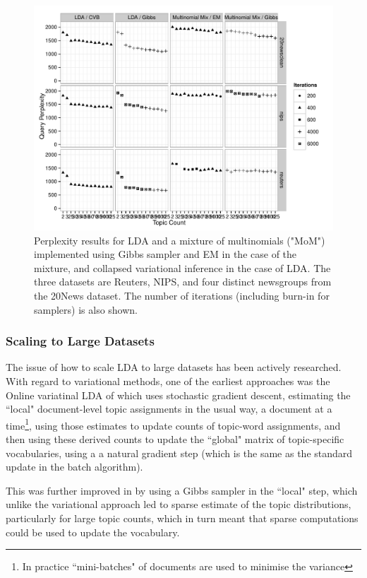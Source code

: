 \begin{figure}
  \centering
    \includegraphics[width=\textwidth]{plots/results-2013-03-18-bw.pdf}
  \caption{Perplexity results for LDA and a mixture of multinomials ("MoM") implemented using Gibbs sampler and EM in the case of the mixture, and collapsed variational inference in the case of LDA. The three datasets are Reuters, NIPS, and four distinct newsgroups from the 20News dataset. The number of iterations (including burn-in for samplers) is also shown.}
  \label{fig:nip-reuters-20news-tests}
\end{figure}

\subsubsection*{Scaling to Large Datasets}
The issue of how to scale LDA to large datasets has been actively researched. With regard to variational methods, one of the earliest approaches was the Online variatinal LDA of \cite{Hoffman2010} which uses stochastic gradient descent\cite{Bottou2004}\cite{Bottou2008}, estimating the ``local" document-level topic assignments in the usual way, a document at a time\footnote{In practice ``mini-batches" of documents are used to minimise the variance}, using those estimates to update counts of topic-word assignments, and then using these derived counts to update the ``global" matrix of topic-specific vocabularies, using a a natural gradient step (which is the same as the standard update in the batch algorithm).

This was further improved in \cite{Mimno2012a} by using a Gibbs sampler in the ``local" step, which unlike the variational approach led to sparse estimate of the topic distributions, particularly for large topic counts, which in turn meant that sparse computations could be used to update the vocabulary.

